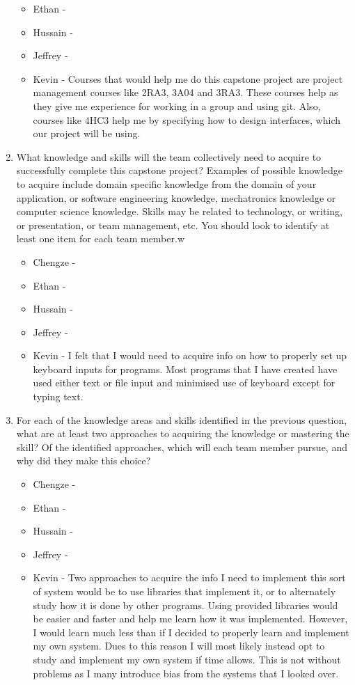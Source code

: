 \begin{enumerate}
\begin{itemize}
        \item Ethan - 
        \item Hussain - 
        \item Jeffrey - 
        \item Kevin - Courses that would help me do this capstone project are project management courses like 2RA3, 3A04 and 3RA3. These courses help as they give me experience for working in a group and using git. Also, courses like 4HC3 help me by specifying how to design interfaces, which our project will be using.  
  \end{itemize} 
  \item What knowledge and skills will the team collectively need to acquire to
  successfully complete this capstone project?  Examples of possible knowledge
  to acquire include domain specific knowledge from the domain of your
  application, or software engineering knowledge, mechatronics knowledge or
  computer science knowledge.  Skills may be related to technology, or writing,
  or presentation, or team management, etc.  You should look to identify at
  least one item for each team member.w
  \begin{itemize}
        \item Chengze - 
        \item Ethan - 
        \item Hussain - 
        \item Jeffrey - 
        \item Kevin - I felt that I would need to acquire info on how to properly set up keyboard inputs for programs. Most programs that I have created have used either text or file input and minimised use of keyboard except for typing text. 
  \end{itemize} 
  \item For each of the knowledge areas and skills identified in the previous
  question, what are at least two approaches to acquiring the knowledge or
  mastering the skill?  Of the identified approaches, which will each team
  member pursue, and why did they make this choice?
  \begin{itemize}
        \item Chengze - 
        \item Ethan - 
        \item Hussain - 
        \item Jeffrey - 
        \item Kevin - Two approaches to acquire the info I need to implement this sort of system would be to use libraries that implement it, or to alternately study how it is done by other programs. Using provided libraries would be easier and faster and help me learn how it was implemented. However, I would learn much less than if I decided to properly learn and implement my own system. Dues to this reason I will most likely instead opt to study and implement my own system  if time allows. This is not without problems as I many introduce bias from the systems that I looked over.
  \end{itemize} 
\end{enumerate}
